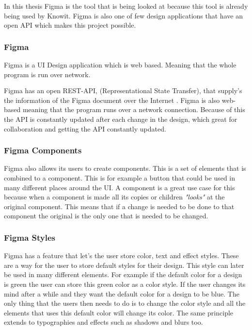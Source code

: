 In this thesis Figma is the tool that is being looked at because this tool is already being used by Knowit. Figma is also one of few design applications that have an open API which makes this project possible. 

 






\subsubsection{Figma}%
\label{sub:Figma}
Figma is a UI Design application which is web based. Meaning that the whole program is run over network. 

Figma has an open REST-API, (Representational State Transfer), that supply's the information of the Figma document over the Internet \cite{figmaFigma, RepresentationalStateTransfer2021}. Figma is also web-based meaning that the program runs over a network connection. Because of this the API is constantly updated after each change in the design, which great for collaboration and getting the API constantly updated.

\subsubsection{Figma Components}%
\label{ssub:Figma Components}

Figma also allows its users to create components. This is a set of elements that is combined to a component. This is for example a button that could be used in many different places around the UI. A component is a great use case for this because when a component is made all its copies or children \textit{"looks"} at the original component. This means that if a change is needed to be done to that component the original is the only one that is needed to be changed.

\subsubsection{Figma Styles}%
\label{ssub:Styles}
Figma has a feature that let's the user store color, text and effect styles. These are a way for the user to store default styles for their design. This style can later be used in many different elements. For example if the default color for a design is green the user can store this green color as a color style. If the user changes its mind after a while and they want the default color for a design to be blue. The only thing that the users then needs to do is to change the color style and all the elements that uses this default color will change its color. The same principle extends to typographies and effects such as shadows and blurs too. 





